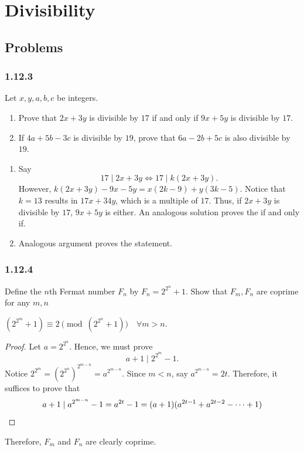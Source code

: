 \section{\textsf{Divisibility}}
\subsection{\textsf{Problems}}
\subsubsection{1.12.3}
\begin{problem}
Let $x,y,a,b,c$ be integers.
\begin{enumerate}
	\item Prove that $2x+3y$ is divisible by $17$ if and only if $9x+5y$ is divisible by $17$.
	\item If $4a+5b-3c$ is divisible by $19$, prove that $6a-2b+5c$ is also divisible by $19$.
\end{enumerate}
\end{problem}
\begin{enumerate}
	\item Say
	      \[
		      17 \mid 2x+3y \iff 17 \mid k(2x+3y).
	      \]
	      However, $k(2x+3y)-9x-5y=x(2k-9)+y(3k-5)$. Notice that $k=13$ results in $17x+34y$, which is
	      a multiple of $17$. Thus, if $2x+3y$ is divisible by $17$, $9x+5y$ is either. An analogous
	      solution proves the if and only if.
	\item Analogous argument proves the statement.
\end{enumerate}

\clearpage

\subsubsection{1.12.4}
\begin{problem}
Define the $n$th Fermat number $F_n$ by $F_n=2^{2^n}+1$. Show that $F_m,F_n$ are coprime for any $m,n$
\end{problem}
\begin{claim}
	$(2^{2^{m}}+1) \equiv 2 \pmod{(2^{2^{n}}+1)} \quad \forall m>n$.
\end{claim}
\begin{proof}
	Let $a=2^{2^{n}}$. Hence, we must prove
	\[
		a+1 \mid 2^{2^{m}}-1.
	\]
	Notice $2^{2^{m}}=(2^{2^{n}})^{2^{m-n}}=a^{2^{m-n}}$. Since $m<n$, say $a^{2^{m-n}}=2t$. Therefore, it suffices to prove that
	\[
		a+1 \mid a^{2^{m-n}}-1 = a^{2t}-1=(a+1)(a^{2t-1}+a^{2t-2}-\dots+1) \qedhere
	\]
\end{proof}
Therefore, $F_m$ and $F_n$ are clearly coprime.

